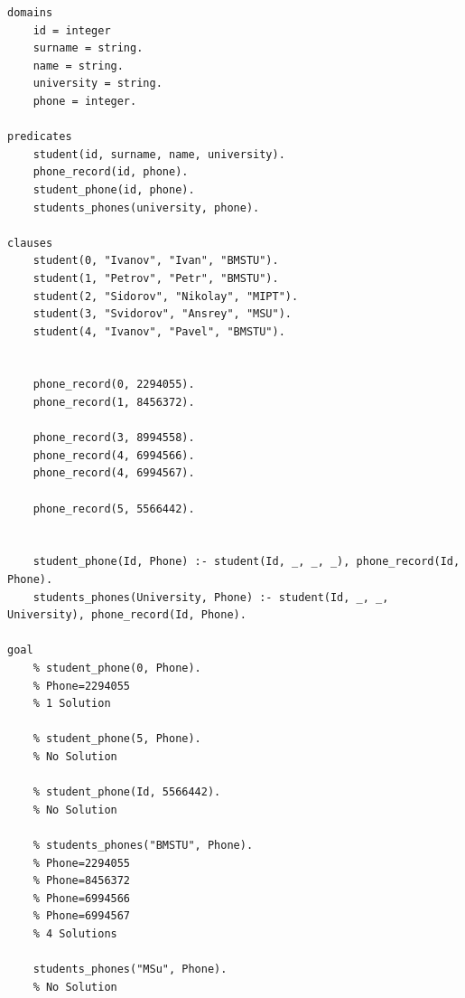 \documentclass[12pt]{report}
\begin{document}
\begin{lstlisting}
domains
	id = integer
	surname = string.
	name = string.
	university = string.
	phone = integer.

predicates
	student(id, surname, name, university).
	phone_record(id, phone).
	student_phone(id, phone).
	students_phones(university, phone).
	
clauses
	student(0, "Ivanov", "Ivan", "BMSTU").
	student(1, "Petrov", "Petr", "BMSTU").
	student(2, "Sidorov", "Nikolay", "MIPT").
	student(3, "Svidorov", "Ansrey", "MSU").
	student(4, "Ivanov", "Pavel", "BMSTU").
	
	
	phone_record(0, 2294055).
	phone_record(1, 8456372).
	
	phone_record(3, 8994558).
	phone_record(4, 6994566).
	phone_record(4, 6994567).
	
	phone_record(5, 5566442).
	
	
	student_phone(Id, Phone) :- student(Id, _, _, _), phone_record(Id, Phone).
	students_phones(University, Phone) :- student(Id, _, _, University), phone_record(Id, Phone).
	
goal
	% student_phone(0, Phone).
	% Phone=2294055
	% 1 Solution
	
	% student_phone(5, Phone).
	% No Solution
	
	% student_phone(Id, 5566442).
	% No Solution
	
	% students_phones("BMSTU", Phone).
	% Phone=2294055
	% Phone=8456372
	% Phone=6994566
	% Phone=6994567
	% 4 Solutions
	
	students_phones("MSu", Phone).
	% No Solution
\end{lstlisting}


















	
\end{document}
